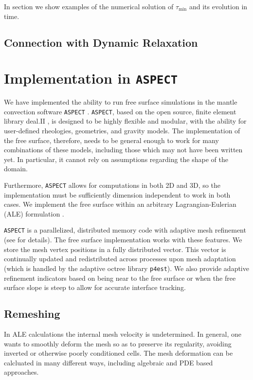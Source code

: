 \documentclass[preprint,12pt,authoryear]{elsarticle}
\begin{document}
In section \label{sec:results} we show examples of the numerical solution of $\tau_\mathrm{min}$
and its evolution in time.

\subsection{Connection with Dynamic Relaxation}
\label{sec:dynamic_relaxation}


\section{Implementation in \texttt{ASPECT} }
\label{sec:implementation}
We have implemented the ability to run free surface simulations in the mantle convection software \texttt{ASPECT} \citep{aspectweb,kronbichler2012high}. 
\texttt{ASPECT}, based on the open source, finite element library deal.II \citep{dealII82}, is designed to be highly flexible and modular, with the ability for user-defined rheologies, geometries, and gravity models. 
The implementation of the free surface, therefore, needs to be general enough to work for many combinations of these models, including those 
which may not have been written yet. In particular, it cannot rely on assumptions regarding the shape of the domain.

Furthermore, \texttt{ASPECT} allows for computations in both 2D and 3D, so the implementation must be sufficiently dimension
independent to work in both cases. We implement the free surface within an arbitrary Lagrangian-Eulerian (ALE) formulation
\citep[e.g][]{fullsack1995arbitrary,donea2004encyclopedia}.

\texttt{ASPECT} is a parallelized, distributed memory code with adaptive mesh refinement (see \cite{BBHK10} for details).
The free surface implementation works with these features.  We store the mesh vertex positions 
in a fully distributed vector. This vector is continually updated and redistributed across 
processes upon mesh adaptation (which is handled by the adaptive octree library \texttt{p4est}).
We also provide adaptive refinement indicators based on being near to the free surface or 
when the free surface slope is steep to allow for accurate interface tracking.


\subsection{Remeshing}
\label{sec:remeshing}

In ALE calculations the internal mesh velocity is undetermined.
In general, one wants to smoothly deform the mesh so as to preserve its regularity, 
avoiding inverted or otherwise poorly conditioned cells.
The mesh deformation can be calcluated in many different ways, including algebraic \citep[e.g.][]{thieulot2011fantom} 
and PDE based approaches.
\end{document}
